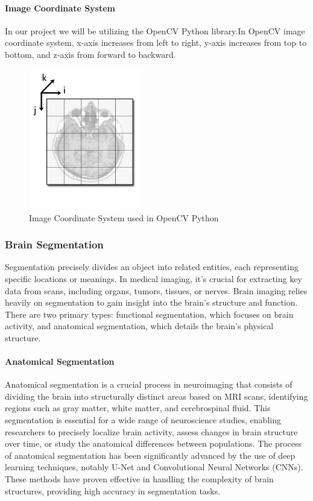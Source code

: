 \documentclass[12pt]{article}
\begin{document}
\paragraph*{Image Coordinate System}
In our project we will be utilizing the OpenCV Python library.In OpenCV image coordinate
system, x-axis increases from left to right, y-axis increases from top to bottom, and z-axis
from forward to backward.
\begin{figure}[hbpt!]
  \centering
  \includegraphics[width=50mm]{image-coordinate-system.png}
  \caption{Image Coordinate System used in OpenCV Python~\cite{SlicerWikiCoordinateSystems}}
  \label{imagecoordfMRI}
\end{figure}





\subsubsection{Brain Segmentation}
Segmentation precisely divides an object into related entities, each representing specific locations or meanings.
In medical imaging, it's crucial for extracting key data from scans, including organs, tumors, tissues, or nerves.
Brain imaging relies heavily on segmentation to gain insight into the brain's structure and function.
There are two primary types: functional segmentation, which focuses on brain activity, and anatomical segmentation, which details the brain's physical structure.

\paragraph*{Anatomical Segmentation} \label{AnSeg}
Anatomical segmentation is a crucial process in neuroimaging that consists of dividing the brain into structurally distinct areas based on MRI scans,
identifying regions such as gray matter, white matter, and cerebrospinal fluid. This segmentation is essential for a wide range of neuroscience studies,
enabling researchers to precisely localize brain activity, assess changes in brain structure over time, or study the anatomical differences between populations.
The process of anatomical segmentation has been significantly advanced by the use of deep learning techniques, notably U-Net and Convolutional Neural Networks (CNNs).
These methods have proven effective in handling the complexity of brain structures, providing high accuracy in segmentation tasks.
\end{document}
